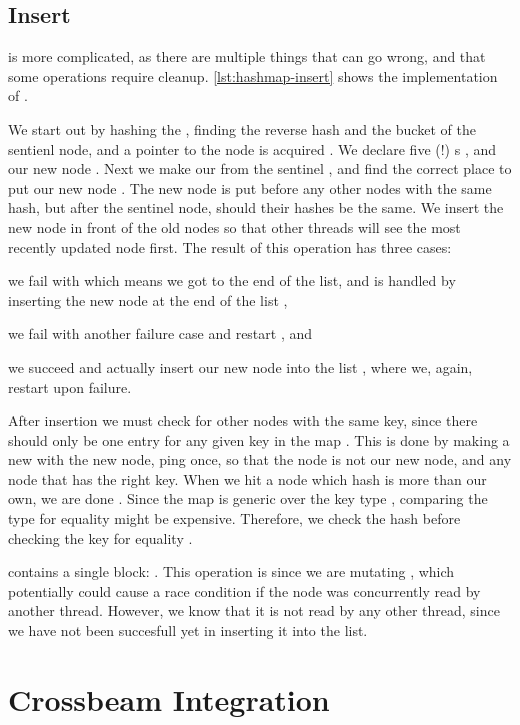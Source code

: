 \subsection{Insert}
 is more complicated, as there are multiple things that can go wrong, and
that some operations require cleanup. \cref{lst:hashmap-insert} shows the implementation of
.



We start out by hashing the , finding the reverse hash  and the bucket of
the sentienl node, and a pointer to the node is acquired . We declare five (!)
s , and  our new node .
Next we make our  from the sentinel , and find the correct place to put
our new node . The new node is put before any other nodes with the same hash, but
after the sentinel node, should their hashes be the same. We insert the new node in front of the
old nodes so that other threads will see the most recently updated node first. The result of this
operation has three cases:
\begin{enumerate*}[1) ]
  \item we fail with  which means we got to the end of the list, and is handled by
    inserting the new node at the end of the list  ,
  \item we fail with another failure case and restart , and
  \item we succeed and actually insert our new node into the list , where we, again,
    restart upon failure.
\end{enumerate*}

After insertion we must check for other nodes with the same key, since there should only be one
entry for any given key in the map . This is done by making a new  with
the new node, ping once, so that the  node is not our new node, and
 any node that has the right key.  When we hit a node which hash is more than our
own, we are done .  Since the map is generic over the key type , comparing
the type for equality might be expensive. Therefore, we check the hash before checking the key for
equality .

 contains a single  block: . This operation is
 since we are mutating , which potentially could cause a race condition
if the node was concurrently read by another thread. However, we know that it is not read by any
other thread, since we have not been succesfull yet in inserting it into the list.




\section{Crossbeam Integration}
\lorem{}
